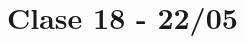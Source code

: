 \documentclass[12pt,a4paper]{book}
\begin{document}
\renewcommand{\contentsname}{\vspace{0cm} Contenido \vspace{-2cm}}
\chapter{Clase 18 - 22/05 }

\end{document}
